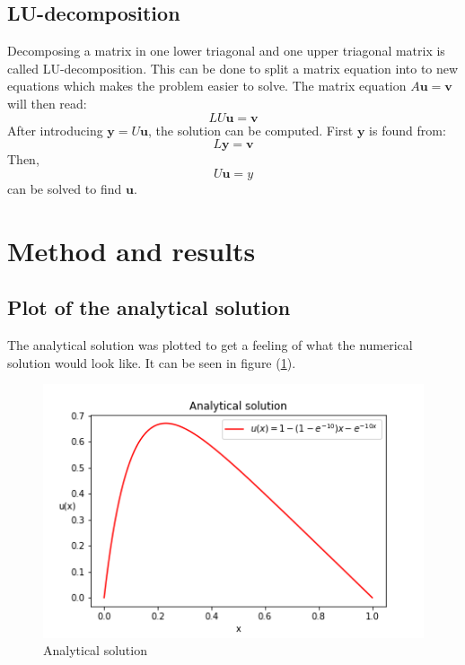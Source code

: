 \documentclass[12pt]{article}
\begin{document}
\subsection{LU-decomposition}
Decomposing a matrix in one lower triagonal and one upper triagonal matrix is called LU-decomposition. This can be done to split a matrix equation into to new equations which makes the problem easier to solve. 
The matrix equation $A\mathbf{u}=\mathbf{v}$ will then read:
\begin{equation}
LU\mathbf{u}=\mathbf{v}
\end{equation}
After introducing $\mathbf{y}=U\mathbf{u}$, the solution can be computed. First $\mathbf{y}$ is found from:
\begin{equation}
L\mathbf{y}=\mathbf{v}
\end{equation}
Then, \begin{equation}
U\mathbf{u}=y
\end{equation}
can be solved to find $\mathbf{u}$. 

\section{Method and results}
\subsection{Plot of the analytical solution}
The analytical solution was plotted to get a feeling of what the numerical solution would look like. It can be seen in figure (\ref{fig:analytical}).

\begin{figure}
\caption{Analytical solution}
\label{fig:analytical}
\includegraphics[]{analytical.png}
\end{figure}
\end{document}
